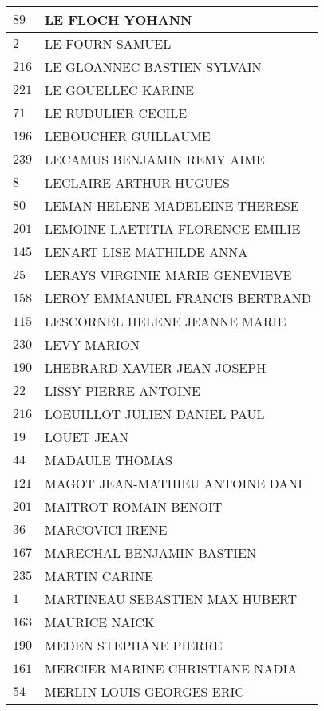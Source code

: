 \begin{xltabular}{\linewidth}{|l|X|}
    \hline
    $89$ & LE FLOCH YOHANN \\
    \hline
    $2$ & LE FOURN SAMUEL \\
    \hline
    $216$ & LE GLOANNEC BASTIEN SYLVAIN \\
    \hline
    $221$ & LE GOUELLEC KARINE \\
    \hline
    $71$ & LE RUDULIER CECILE \\
    \hline
    $196$ & LEBOUCHER GUILLAUME \\
    \hline
    $239$ & LECAMUS BENJAMIN REMY AIME \\
    \hline
    $8$ & LECLAIRE ARTHUR HUGUES \\
    \hline
    $80$ & LEMAN HELENE MADELEINE THERESE \\
    \hline
    $201$ & LEMOINE LAETITIA FLORENCE EMILIE \\
    \hline
    $145$ & LENART LISE MATHILDE ANNA \\
    \hline
    $25$ & LERAYS VIRGINIE MARIE GENEVIEVE \\
    \hline
    $158$ & LEROY EMMANUEL FRANCIS BERTRAND \\
    \hline
    $115$ & LESCORNEL HELENE JEANNE MARIE \\
    \hline
    $230$ & LEVY MARION \\
    \hline
    $190$ & LHEBRARD XAVIER JEAN JOSEPH \\
    \hline
    $22$ & LISSY PIERRE ANTOINE \\
    \hline
    $216$ & LOEUILLOT JULIEN DANIEL PAUL \\
    \hline
    $19$ & LOUET JEAN \\
    \hline
    $44$ & MADAULE THOMAS \\
    \hline
    $121$ & MAGOT JEAN-MATHIEU ANTOINE DANI \\
    \hline
    $201$ & MAITROT ROMAIN BENOIT \\
    \hline
    $36$ & MARCOVICI IRENE \\
    \hline
    $167$ & MARECHAL BENJAMIN BASTIEN \\
    \hline
    $235$ & MARTIN CARINE \\
    \hline
    $1$ & MARTINEAU SEBASTIEN MAX HUBERT \\
    \hline
    $163$ & MAURICE NAICK \\
    \hline
    $190$ & MEDEN STEPHANE PIERRE \\
    \hline
    $161$ & MERCIER MARINE CHRISTIANE NADIA \\
    \hline
    $54$ & MERLIN LOUIS GEORGES ERIC \\

\end{xltabular}
